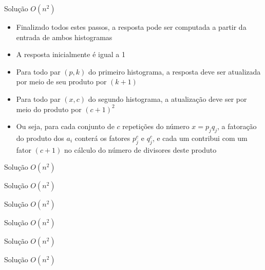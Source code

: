 \begin{frame}[fragile]{Solução $O(n^2)$}

    \begin{itemize}
        \item Finalizado todos estes passos, a resposta pode ser computada a partir da entrada
            de ambos histogramas

        \item A resposta inicialmente é igual a 1

        \item Para todo par $(p, k)$ do primeiro histograma, a resposta deve ser atualizada
            por meio de seu produto por $(k + 1)$

        \item Para todo par $(x, c)$ do segundo histograma, a atualização deve ser por meio do
            produto por $(c + 1)^2$

        \item Ou seja, para cada conjunto de $c$ repetições do número $x = p_jq_j$, a fatoração
            do produto dos $a_i$ conterá os fatores $p_j^c$ e $q_j^c$, e cada um contribui com
            um fator $(c + 1)$ no cálculo do número de divisores deste produto
    \end{itemize}

\end{frame}
\begin{frame}[fragile]{Solução $O(n^2)$}
\end{frame}

\begin{frame}[fragile]{Solução $O(n^2)$}
\end{frame}

\begin{frame}[fragile]{Solução $O(n^2)$}
\end{frame}

\begin{frame}[fragile]{Solução $O(n^2)$}
\end{frame}

\begin{frame}[fragile]{Solução $O(n^2)$}
\end{frame}

\begin{frame}[fragile]{Solução $O(n^2)$}
\end{frame}
